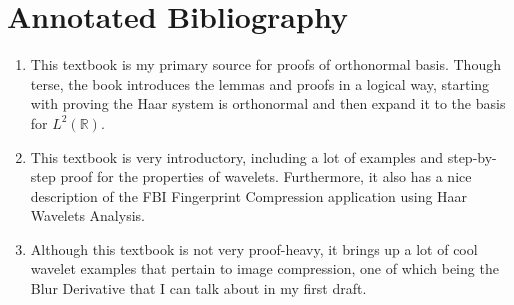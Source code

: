 \documentclass[2pt]{amsart}
\theoremstyle{theorem} %
\theoremstyle{definition}
\theoremstyle{example}
\theoremstyle{remark}
\numberwithin{equation}{section}
\newcommand{\R}{\mathbb{R}}
\begin{document}
\section{Annotated Bibliography}
\begin{enumerate}
	\item {}
	
	\smallskip
	This textbook is my primary source for proofs of orthonormal basis. Though terse, the book introduces the lemmas and proofs in a logical way, starting with proving the Haar system is orthonormal and then expand it to the basis for $L^2(\R)$.
	
	\item {}
	
	\smallskip
	This textbook is very introductory, including a lot of examples and step-by-step proof for the properties of wavelets. Furthermore, it also has a nice description of the FBI Fingerprint Compression application using Haar Wavelets Analysis.	
	
	\item {}
	
	\smallskip
	Although this textbook is not very proof-heavy, it brings up a lot of cool wavelet examples that pertain to image compression, one of which being the Blur Derivative that I can talk about in my first draft.
\end{enumerate}	
	
\end{document}
